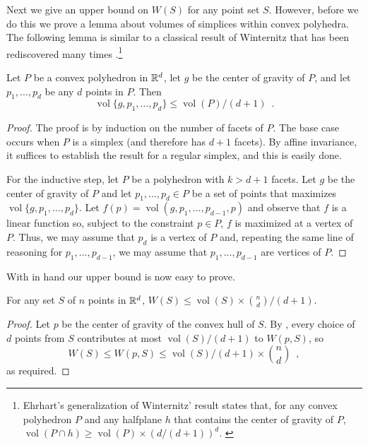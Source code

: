 \documentclass[lotsofwhite]{patmorin}
\DeclareMathOperator{\vol}{vol}
\begin{document}
Next we give an upper bound on $W(S)$ for any point set $S$.  However,
before we do this we prove a lemma about volumes of simplices within
convex polyhedra. The following lemma is similar to a classical result
of Winternitz \cite{X} that has been rediscovered many times
\cite{X}.\footnote{Ehrhart's generalization of Winternitz' result
states that, for any convex polyhedron $P$ and any halfplane $h$ that
contains the center of gravity of $P$, $\vol(P\cap h) \ge
\vol(P)\times (d/(d+1))^d$. \cite{eXX}}

\begin{lem}
Let $P$ be a convex polyhedron in $\mathbb{R}^d$, let $g$ be the center of
gravity of $P$, and let $p_1,\ldots,p_d$ be any $d$ points in $P$. Then
\[
   \vol\{g,p_1,\ldots,p_d\} \le \vol(P) / (d+1) \enspace .
\] 
\end{lem}

\begin{proof}
The proof is by induction on the number of facets of $P$.  The base
case occurs when $P$ is a simplex (and therefore has $d+1$ facets).
By affine invariance, it suffices to establish the result for a
regular simplex, and this is easily done.

For the inductive step, let $P$ be a polyhedron with $k > d+1$
facets.   Let $g$ be the center of gravity of $P$ and let
$p_1,\ldots,p_d\in P$ be a set of points that maximizes
$\vol\{g,p_1,\ldots,p_d\}$.  Let $f(p)=\vol(g,p_1,\ldots,p_{d-1},p)$
and observe that $f$ is a linear function so, subject to the
constraint $p\in P$, $f$ is maximized at a vertex of $P$.  Thus, we
may assume that $p_d$ is a vertex of $P$ and, repeating the same line
of reasoning for $p_1,\ldots,p_{d-1}$, we may assume that
$p_1,\ldots,p_{d-1}$ are vertices of $P$.

\end{proof}


With  in hand our upper bound is now easy to prove.

\begin{thm}
For any set $S$ of $n$ points in $\mathbb{R}^d$, $W(S) \le \vol(S)\times {n \choose
d}/(d+1)$.
\end{thm}

\begin{proof}
Let $p$ be the center of gravity of the convex hull of $S$.  By
,
every choice of $d$ points from $S$ contributes at most
$\vol(S)/(d+1)$ to $W(p,S)$, so
\[
    W(S) \le W(p,S) \le \vol(S)/(d+1)\times {n\choose d} \enspace ,
\]
as required.
\end{proof}
\end{document}
